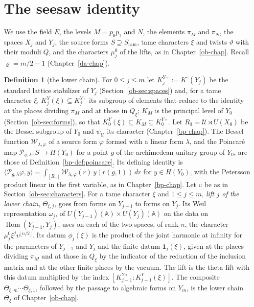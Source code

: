 \documentclass[reqno]{amsart}
\newcounter{chap}
\theoremstyle{definition}
\newtheorem{definition}{Definition}[section]
\theoremstyle{plain}
\newcommand{\Pc}{\mathcal{P}}
\newcommand{\Wc}{\mathcal{W}}
\newcommand{\Hom}{\operatorname{Hom}}
\newcommand{\ram}{\mathrm{ram}}
\begin{document}
\section{The seesaw identity}\label{sec:theorem}

We use the field \(E\), the levels \(M = p_0p_1\) and \(N\), the elements \(\pi_M\) and \(\pi_N\), the spaces \(X_j\) and \(Y_j\), the source forms \(S \supseteq S_{\ram}\), tame characters \(\xi\) and twists \(\vartheta\) with their moduli \(Q\), and the characters \(\mu_j^0\) of the lifts, as in Chapter~\ref{ob-chap}.  Recall \(\varrho = m/2 - 1\) (Chapter~\ref{da-chap}).

\begin{definition}[the lower chain]\label{def:lower}
For \(0 \le j \le m\) let \(K^{Y\circ}_j := K^\circ(Y_j)\) be the standard lattice stabilizer of \(Y_j\) (Section~\ref{ob-sec:spaces}) and, for a tame character \(\xi\), \(K^Y_j(\xi) \subseteq K^{Y\circ}_j\) its subgroup of elements that reduce to the identity at the places dividing \(\pi_M\) and at those in \(Q_\xi\); \(K_M\) is the principal level of \(Y_0\) (Section~\ref{ob-sec:forms}), so that \(K^Y_0(\xi) \subseteq K_M \subseteq K^{Y\circ}_0\).  Let \(R_0 = \mathcal U \rtimes U(X_0)\) be the Bessel subgroup of \(Y_0\) and \(\psi_{\mathcal U}\) its character (Chapter~\ref{bp-chap}).  The Bessel function \(\Wc_{\lambda,\varphi}\) of a source form \(\varphi\) formed with a linear form \(\lambda\), and the Poincar\'e map \(\Pc_{g,\lambda}\colon S\to H(Y_0)\) for a point \(g\) of the archimedean unitary group of \(Y_0\), are those of Definition~\ref{bp-def:poincare}.  Its defining identity is \(\langle \Pc_{g,\lambda}\varphi, y\rangle = \int_{[R_0]} \Wc_{\lambda,\varphi}(r)\,\overline{y(r(g,1))}\,dr\) for \(y\in H(Y_0)\), with the Petersson product linear in the first variable, as in Chapter~\ref{bp-chap}.  Let \(\upsilon\) be as in Section~\ref{ob-sec:characters}.  For a tame character \(\xi\) and \(1 \le j \le m\), \emph{lift \(j\) of the lower chain}, \(\Theta_{\xi,j}\), goes from forms on \(Y_{j-1}\) to forms on \(Y_j\).  Its Weil representation \(\omega_j\), of \(U(Y_{j-1})(\mathbb A) \times U(Y_j)(\mathbb A)\) on the data on \(\Hom(Y_{j-1}, Y_j)\), uses on each of the two spaces, of rank \(n\), the character \(\mu_j^0\xi^j\upsilon^{\lfloor n/2\rfloor}\).  Its datum \(\phi_j(\xi)\) is the product of the joint harmonic at infinity for the parameters of \(Y_{j-1}\) and \(Y_j\) and the finite datum \(\mathbf 1_j(\xi)\), given at the places dividing \(\pi_M\) and at those in \(Q_\xi\) by the indicator of the reduction of the inclusion matrix and at the other finite places by the vacuum.  The lift is the theta lift with this datum multiplied by the index \([K^{Y\circ}_{j-1} : K^Y_{j-1}(\xi)]\).  The composite \(\Theta_{\xi,m}\cdots\Theta_{\xi,1}\), followed by the passage to algebraic forms on \(Y_m\), is the lower chain \(\Theta_\xi\) of Chapter~\ref{ob-chap}.
\end{definition}
\end{document}
